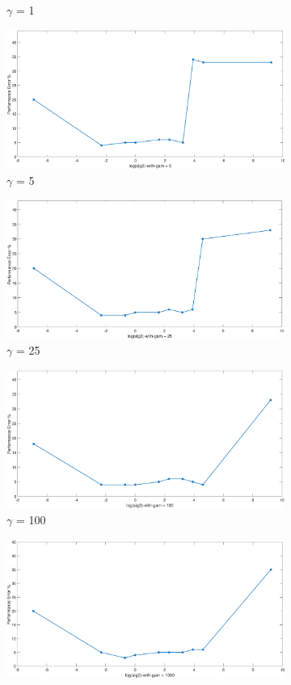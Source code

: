 \documentclass[12pt]{report}
\begin{document}
{\begin{figure}[!ht]
\begin{floatrow}
{\begin{subfigure}{.3\textwidth}
				\caption{$\gamma$ = 1}
				\label{fig:kCV_gamma(1))}
			\end{subfigure}
			\begin{subfigure}{.3\textwidth}
				\includegraphics[height=0.35\linewidth,width=0.7\linewidth]{Ex1.3_kCV_gam(5).eps}
				\caption{$\gamma$ = 5}
				\label{fig:kCV_gamma(5)}
			\end{subfigure}%
			\begin{subfigure}{.3\textwidth}
				\includegraphics[height=0.35\linewidth,width=0.7\linewidth]{Ex1.3_kCV_gam(25).eps}
				\caption{$\gamma$ = 25}
				\label{fig:kCV_gamma(25)}
			\end{subfigure}
			\begin{subfigure}{.3\textwidth}
				\includegraphics[height=0.35\linewidth,width=0.7\linewidth]{Ex1.3_kCV_gam(100).eps}
				\caption{$\gamma$ = 100}
				\label{fig:kCV_gamma(100)}
			\end{subfigure}%
			\begin{subfigure}{.3\textwidth}
				\includegraphics[height=0.35\linewidth,width=0.7\linewidth]{Ex1.3_kCV_gam(1000).eps}

\end{subfigure}}
\end{floatrow}
\end{figure}}
\end{document}
